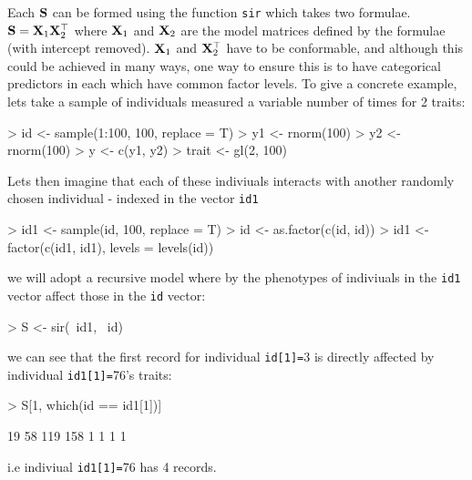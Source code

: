 \documentclass{article}
\begin{document}
Each ${\bf S}$ can be formed using the function \texttt{sir} which takes two formulae. ${\bf S} = {\bf X}_{1}{\bf X}_{2}^{\top}$ where ${\bf X}_{1}$ and ${\bf X}_{2}$ are the model matrices defined by the formulae (with intercept removed).  ${\bf X}_{1}$ and ${\bf X}_{2}^{\top}$ have to be conformable, and although this could be achieved in many ways, one way to ensure this is to have categorical predictors in each which have common factor levels.  To give a concrete example, lets take a sample of individuals measured a variable number of times for 2 traits: 

\begin{Schunk}
\begin{Sinput}
> id <- sample(1:100, 100, replace = T)
> y1 <- rnorm(100)
> y2 <- rnorm(100)
> y <- c(y1, y2)
> trait <- gl(2, 100)
\end{Sinput}
\end{Schunk}


Lets then imagine that each of these indiviuals interacts with another randomly chosen individual - indexed in the vector \texttt{id1}

\begin{Schunk}
\begin{Sinput}
> id1 <- sample(id, 100, replace = T)
> id <- as.factor(c(id, id))
> id1 <- factor(c(id1, id1), levels = levels(id))
\end{Sinput}
\end{Schunk}

we will adopt a recursive model where by the phenotypes of indiviuals in the \texttt{id1} vector affect those in the \texttt{id} vector:

\begin{Schunk}
\begin{Sinput}
> S <- sir(~id1, ~id)
\end{Sinput}
\end{Schunk}

we can see that the first record for individual \texttt{id[1]=}3 is directly affected by individual \texttt{id1[1]=}76's traits:

\begin{Schunk}
\begin{Sinput}
> S[1, which(id == id1[1])]
\end{Sinput}
\begin{Soutput}
 19  58 119 158 
  1   1   1   1 
\end{Soutput}
\end{Schunk}

i.e indiviual  \texttt{id1[1]=}76 has 4 records.\\
\end{document}
